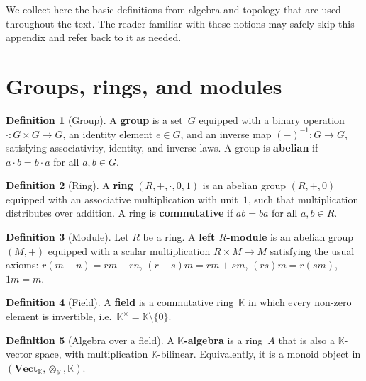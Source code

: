 \documentclass[a4paper,12pt]{book}
\newcommand{\Vect}{\mathbf{Vect}}
\newcommand{\K}{\mathbb{K}}
\theoremstyle{definition}
\newtheorem{definition}{Definition}[section]
\theoremstyle{plain}
\theoremstyle{remark}
\begin{document}
\vspace{1em}

We collect here the basic definitions from algebra and topology that
are used throughout the text.  The reader familiar with these notions
may safely skip this appendix and refer back to it as needed.

\section{Groups, rings, and modules}\label{sec:app-algebra}

\begin{definition}[Group]\label{def:app-group}
A \textbf{group} is a set~$G$ equipped with a binary operation
$\cdot\colon G\times G\to G$, an identity element $e\in G$, and an
inverse map $(-)^{-1}\colon G\to G$, satisfying associativity,
identity, and inverse laws.  A group is \textbf{abelian} if
$a\cdot b = b\cdot a$ for all $a,b\in G$.
\end{definition}

\begin{definition}[Ring]\label{def:app-ring}
A \textbf{ring} $(R, +, \cdot, 0, 1)$ is an abelian group $(R,+,0)$
equipped with an associative multiplication with unit~$1$, such that
multiplication distributes over addition.  A ring is \textbf{commutative}
if $ab = ba$ for all $a,b\in R$.
\end{definition}

\begin{definition}[Module]\label{def:app-module}
Let $R$ be a ring.  A \textbf{left $R$-module} is an abelian group $(M,+)$
equipped with a scalar multiplication $R\times M\to M$ satisfying the
usual axioms: $r(m+n) = rm+rn$, $(r+s)m = rm+sm$, $(rs)m = r(sm)$,
$1m = m$.
\end{definition}

\begin{definition}[Field]\label{def:app-field}
A \textbf{field} is a commutative ring~$\K$ in which every non-zero
element is invertible, i.e.\ $\K^\times = \K\setminus\{0\}$.
\end{definition}

\begin{definition}[Algebra over a field]\label{def:app-algebra}
A \textbf{$\K$-algebra} is a ring~$A$ that is also a $\K$-vector space,
with multiplication $\K$-bilinear.  Equivalently, it is a monoid object
in $(\Vect_\K, \otimes_\K, \K)$.
\end{definition}
\end{document}
